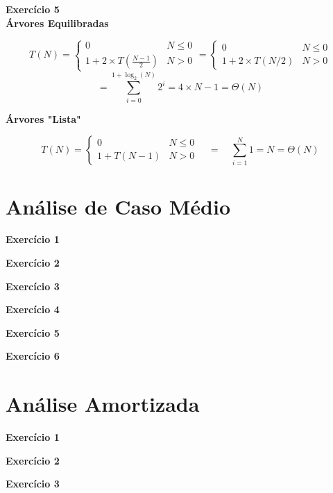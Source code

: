 \documentclass[a4paper,11pt]{article}
\begin{document}
	\noindent \textbf{Exercício 5}\\
	
	\noindent \textbf{Árvores Equilibradas}
	
	\[
		T(N) = 
		\begin{cases}
			0 & N \leq 0 \\
			1 + 2 \times T(\frac{N-1}{2}) & N > 0
		\end{cases}
		=
		\begin{cases}
			0 & N \leq 0 \\
			1 + 2 \times T(N/2) & N > 0
		\end{cases}
	\]
	\[
		= \sum_{i=0}^{1 + \log_2(N)} 2^i = 4 \times N - 1 = \Theta(N)
	\]
	
	\noindent \textbf{Árvores "Lista"}
	
	\[
	T(N) = 
	\begin{cases}
		0 & N \leq 0 \\
		1 + T(N - 1) & N > 0
	\end{cases}
	\quad = \quad \sum_{i=1}^{N} 1 = N = \Theta(N)
	\]
	
	
	
	\section{Análise de Caso Médio}
	
	\noindent \textbf{Exercício 1}
	
	\noindent \textbf{Exercício 2}
	
	\noindent \textbf{Exercício 3}
	
	\noindent \textbf{Exercício 4}
	
	\noindent \textbf{Exercício 5}
	
	\noindent \textbf{Exercício 6}
	
	
	\section{Análise Amortizada}
	
	\noindent \textbf{Exercício 1}
	
	\noindent \textbf{Exercício 2}
	
	\noindent \textbf{Exercício 3}
	
	
\end{document}
